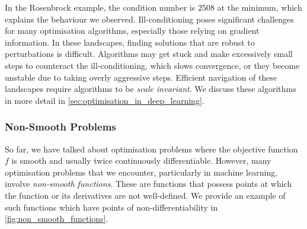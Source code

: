 In the Rosenbrock example, the condition number is $2508$ at the minimum, which explains the behaviour we observed. Ill-conditioning poses significant challenges for many optimisation algorithms, especially those relying on gradient information. In these landscapes, finding solutions that are robust to perturbations is difficult. Algorithms may get stuck and make excessively small steps to counteract the ill-conditioning, which slows convergence, or they become unstable due to taking overly aggressive steps. Efficient navigation of these landscapes require algorithms to be \textit{scale invariant}. We discuss these algorithms in more detail in \cref{sec:optimisation_in_deep_learning}.



\subsubsection{Non-Smooth Problems}

\label{sssec:non_smooth_problems}



So far, we have talked about optimisation problems where the objective function $f$ is smooth and usually twice continuously differentiable. However, many optimisation problems that we encounter, particularly in machine learning, involve \textit{non-smooth functions}. These are functions that possess points at which the function or its derivatives are not well-defined. We provide an example of such functions which have points of non-differentiability in \cref{fig:non_smooth_functions}. 




